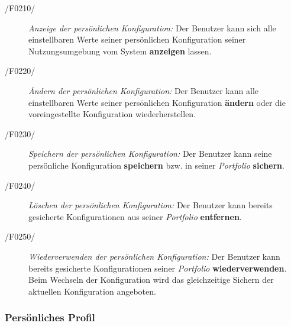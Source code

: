 \begin{description}
  \item[/F0210/]
    \textit{Anzeige der persönlichen Konfiguration:}
    Der Benutzer kann sich alle einstellbaren Werte seiner persönlichen Konfiguration seiner Nutzungsumgebung vom System \textbf{anzeigen} lassen.
  \item[/F0220/]
    \textit{Ändern der persönlichen Konfiguration:}
    Der Benutzer kann alle einstellbaren Werte seiner persönlichen Konfiguration \textbf{ändern}
    oder die voreingestellte Konfiguration wiederherstellen.
  \item[/F0230/]
    \textit{Speichern der persönlichen Konfiguration:}
    Der Benutzer kann seine persönliche Konfiguration \textbf{speichern} bzw. in seiner \textit{Portfolio} \textbf{sichern}.
  \item[/F0240/]
    \textit{Löschen der persönlichen Konfiguration:}
    Der Benutzer kann bereits gesicherte Konfigurationen aus seiner \textit{Portfolio} \textbf{entfernen}.
  \item[/F0250/]
    \textit{Wiederverwenden der persönlichen Konfiguration:}
    Der Benutzer kann bereits gesicherte Konfigurationen seiner \textit{Portfolio} \textbf{wiederverwenden}.
    Beim Wechseln der Konfiguration wird das gleichzeitige Sichern der aktuellen Konfiguration angeboten.
\end{description}

\subsubsection{Persönliches Profil}


